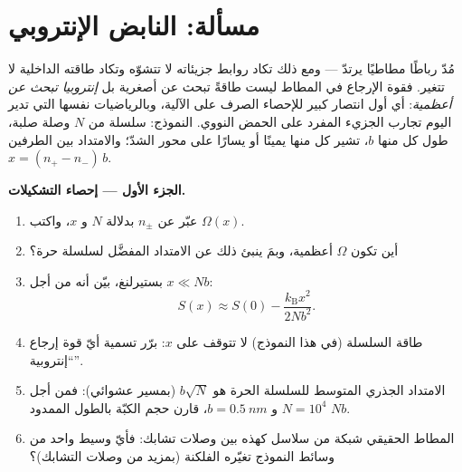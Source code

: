 \section{مسألة: النابض الإنتروبي}

\begin{problem}\label{pb:b3:microcanonical-ensemble:1}
مُدّ رباطًا مطاطيًا يرتدّ --- ومع ذلك تكاد روابط جزيئاته
لا تتشوّه وتكاد طاقته الداخلية لا تتغير.
فقوة الإرجاع في المطاط ليست طاقةً تبحث عن أصغرية بل
\emph{إنتروبيا تبحث عن أعظمية}: أي أول انتصار كبير للإحصاء
الصرف على الآلية، وبالرياضيات نفسها التي تدير اليوم تجارب
الجزيء المفرد على الحمض النووي. النموذج: سلسلة من $N$ وصلة صلبة،
طول كل منها $b$، تشير كل منها يمينًا أو يسارًا على محور الشدّ؛
والامتداد بين الطرفين $x = (n_+ - n_-)\,b$.

\medskip\noindent\textbf{الجزء الأول --- إحصاء التشكيلات.}
\begin{enumerate}
  \item عبّر عن $n_\pm$ بدلالة $N$ و $x$، واكتب
         $\Omega(x)$.
  \item أين تكون $\Omega$ أعظمية، وبمَ ينبئ ذلك عن
        الامتداد المفضَّل لسلسلة حرة؟
  \item بستيرلنغ، بيّن أنه من أجل $x \ll Nb$:
        \[
        S(x) \approx S(0) - \frac{k_{\text{B}}x^2}{2Nb^2} .
        \]
  \item طاقة السلسلة (في هذا النموذج) لا تتوقف على $x$:
        برّر تسمية أيّ قوة إرجاع ``إنتروبية''.
  \item الامتداد الجذري المتوسط للسلسلة الحرة هو $b\sqrt N$
        (بمسير عشوائي): فمن أجل $N = 10^4$ و $b = \qty{0.5}{nm}$،
        قارن حجم الكبّة بالطول الممدود $Nb$.
  \item المطاط الحقيقي شبكة من سلاسل كهذه بين
        وصلات تشابك: فأيّ وسيط واحد من وسائط النموذج
        تغيّره الفلكنة (بمزيد من وصلات التشابك)؟
\end{enumerate}


\end{problem}
